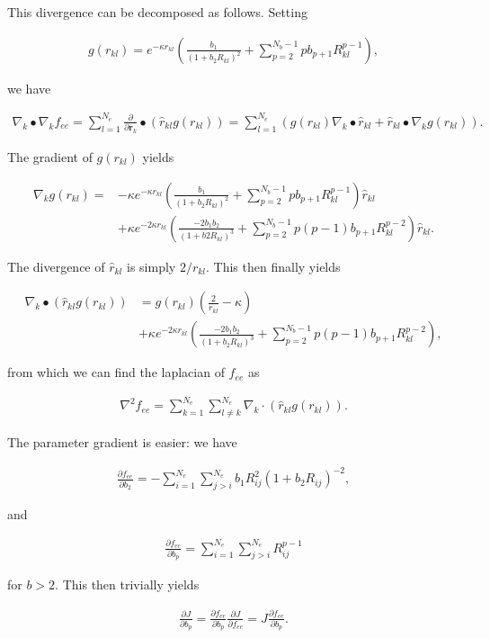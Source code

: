 \documentclass{article}
\begin{document}
This divergence can be decomposed as follows. Setting

\begin{align}
  g(r_{kl}) = e^{-\kappa r_{kl}} \left( \frac{b_1}{(1 + b_2 R_{kl})^2} 
    + \sum_{p=2}^{N_b - 1}pb_{p+1}R_{kl}^{p-1} \right),
\end{align}

we have

\begin{align}
  \nabla_k \bullet \nabla_k f_{ee} = \sum_{l=1}^{N_e}\frac{\partial}{\partial \mathbf{r}_k} 
    \bullet \left( \hat{r}_{kl} g(r_{kl}) \right)
    = \sum_{l=1}^{N_e}(g(r_{kl})\nabla_k \bullet \hat{r}_{kl} + \hat{r}_{kl} \bullet \nabla_k g(r_{kl})).
\end{align}

The gradient of $g(r_{kl})$ yields

\begin{align}
  \nabla_k g(r_{kl}) = &-\kappa e^{-\kappa r_{kl}}\left( 
    \frac{b_1}{(1 + b_2 R_{kl})^2} + \sum_{p=2}^{N_b - 1} p b_{p+1} R_{kl}^{p-1}
    \right)\hat{r}_{kl}\\
    & + \kappa e^{-2\kappa r_{kl}}\left( 
    \frac{-2b_1b_2}{(1 + b2R_{kl})^3} + \sum_{p=2}^{N_b - 1}p(p-1)b_{p+1}R_{kl}^{p-2} 
    \right)\hat{r}_{kl}.
\end{align}

The divergence of $\hat{r}_{kl}$ is simply $2/r_{kl}$. This then finally yields

\begin{align}
  \nabla_k \bullet (\hat{r}_{kl}g(r_{kl})) &= g(r_{kl})\left(\frac{2}{r_{kl}} - \kappa\right)\\
    &+ \kappa e^{-2\kappa r_{kl}}\left( 
      \frac{-2b_1b_2}{(1 + b_2R_{kl})^3} + \sum_{p=2}^{N_b - 1} p(p-1)b_{p+1}R_{kl}^{p-2}  
    \right),
\end{align}

from which we can find the laplacian of $f_{ee}$ as

\begin{align}
  \nabla^2 f_{ee} = \sum_{k=1}^{N_e} \sum_{l \neq k}^{N_e} \nabla_k 
    \cdot (\hat{r}_{kl}g(r_{kl})).
\end{align}

The parameter gradient is easier: we have

\begin{align}
  \frac{\partial f_{ee}}{\partial b_2} = -\sum_{i=1}^{N_e}\sum_{j>i}^{N_e}
      b_1 R_{ij}^2(1 + b_2 R_{ij})^{-2}, 
\end{align}

and

\begin{align}
  \frac{\partial f_{ee}}{\partial b_p} = \sum_{i=1}^{N_e}\sum_{j>i}^{N_e}
    R_{ij}^{p-1} 
\end{align}

for $b > 2$. This then trivially yields

\begin{align}
    \frac{\partial J}{\partial b_p} = \frac{\partial f_{ee}}{\partial b_p}
        \frac{\partial J}{\partial f_{ee}} = J\frac{\partial f_{ee}}{\partial b_p}.
\end{align}
\end{document}
